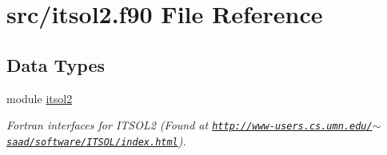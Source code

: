 \hypertarget{itsol2_8f90}{\section{src/itsol2.f90 File Reference}
\label{itsol2_8f90}
}
\subsection*{Data Types}
\begin{DoxyCompactItemize}
\item 
module \hyperlink{classitsol2}{itsol2}
\begin{DoxyCompactList}\small\item\em Fortran interfaces for I\-T\-S\-O\-L2 (Found at \href{http://www-users.cs.umn.edu/~saad/software/ITSOL/index.html}{\tt http\-://www-\/users.\-cs.\-umn.\-edu/$\sim$saad/software/\-I\-T\-S\-O\-L/index.\-html}). \end{DoxyCompactList}\end{DoxyCompactItemize}
